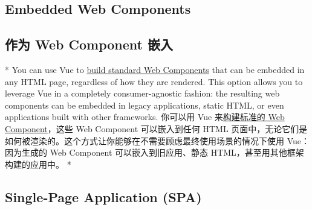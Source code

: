 \begin{paracol}{2}
\subsection{Embedded Web Components}
\switchcolumn
\subsection{作为 Web Component 嵌入}
\switchcolumn[0]*%
You can use Vue to
\href{https://vuejs.org/guide/extras/web-components.html}{build standard
Web Components} that can be embedded in any HTML page, regardless of how
they are rendered. This option allows you to leverage Vue in a
completely consumer-agnostic fashion: the resulting web components can
be embedded in legacy applications, static HTML, or even applications
built with other frameworks.
\switchcolumn
你可以用 Vue
来\href{https://cn.vuejs.org/guide/extras/web-components.html}{构建标准的
Web Component}，这些 Web Component 可以嵌入到任何 HTML
页面中，无论它们是如何被渲染的。这个方式让你能够在不需要顾虑最终使用场景的情况下使用
Vue：因为生成的 Web Component 可以嵌入到旧应用、静态
HTML，甚至用其他框架构建的应用中。
\switchcolumn[0]*%
\subsection{Single-Page Application (SPA)}
\switchcolumn

\end{paracol}

